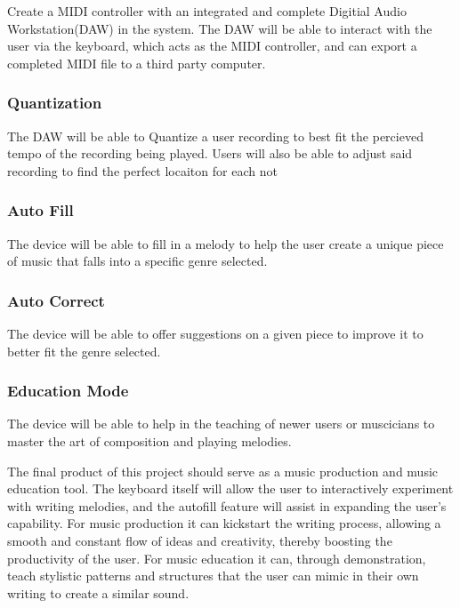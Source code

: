 Create a MIDI controller with an integrated and complete Digitial Audio
Workstation(DAW) in the system. The DAW will be able to interact with the user
via the keyboard, which acts as the MIDI controller, and can export a completed
MIDI file to a third party computer.

\subsubsection{Quantization}

The DAW will be able to Quantize a user recording to best fit the percieved
tempo of the recording being played. Users will also be able to adjust said
recording to find the perfect locaiton for each not

\subsubsection{Auto Fill}

The device will be able to fill in a melody to help the user create a unique
piece of music that falls into a specific genre selected.

\subsubsection{Auto Correct}

The device will be able to offer suggestions on a given piece to improve it to
better fit the genre selected.

\subsubsection{Education Mode}

The device will be able to help in the teaching of newer users or muscicians to
master the art of composition and playing melodies.

The final product of this project should serve as a music production and music
education tool. The keyboard itself will allow the user to interactively experiment with
writing melodies, and the autofill feature will assist in expanding the user’s capability.
For music production it can kickstart the writing process, allowing a smooth and
constant flow of ideas and creativity, thereby boosting the productivity of the user.
For music education it can, through demonstration, teach stylistic patterns and
structures that the user can mimic in their own writing to create a similar sound.

